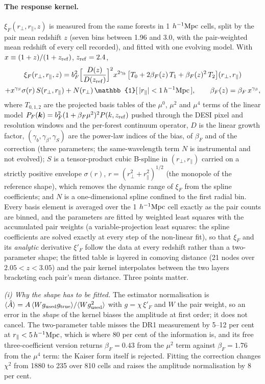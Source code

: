 \documentclass[11pt,a4paper]{article}
\newcommand{\Mpch}{\,h^{-1}{\rm Mpc}}
\begin{document}
\paragraph{The response kernel.} $\xi_F(r_\perp,r_\parallel,z)$ is measured from the same forests in 1\,$\Mpch$ cells, split by the pair mean redshift $z$ (seven bins between 1.96 and 3.0, with the pair-weighted mean redshift of every cell recorded), and fitted with one evolving model. With $x\equiv(1+z)/(1+z_{\rm ref})$, $z_{\rm ref}=2.4$,
\begin{multline}
\xi_F(r_\perp,r_\parallel,z)=b_F^2\Big[\frac{D(z)}{D(z_{\rm ref})}\Big]^2x^{2\gamma_b}\,\big[T_0+2\beta_F(z)\,T_1+\beta_F(z)^2\,T_2\big](r_\perp,r_\parallel)\\
+x^{\gamma_S}\sigma(r)\,S(r_\perp,r_\parallel)+N(r_\perp)\,\mathbb{1}[\,|r_\parallel|<1\Mpch\,],\qquad\beta_F(z)=\beta_F\,x^{\gamma_\beta},
\label{eq:xifit}
\end{multline}
where $T_{0,1,2}$ are the projected basis tables of the $\mu^0$, $\mu^2$ and $\mu^4$ terms of the linear model $P_F(\bm k)=b_F^2(1+\beta_F\mu^2)^2P(k,z_{\rm ref})$ pushed through the DESI pixel and resolution windows and the per-forest continuum operator, $D$ is the linear growth factor, $(\gamma_b,\gamma_\beta,\gamma_S)$ are the power-law indices of the bias, of $\beta_F$ and of the correction (three parameters; the same-wavelength term $N$ is instrumental and not evolved); $S$ is a tensor-product cubic B-spline in $(r_\perp,r_\parallel)$ carried on a strictly positive envelope $\sigma(r)$, $r=(r_\perp^2+r_\parallel^2)^{1/2}$ (the monopole of the reference shape), which removes the dynamic range of $\xi_F$ from the spline coefficients; and $N$ is a one-dimensional spline confined to the first radial bin. Every basis element is averaged over the 1\,$\Mpch$ cell exactly as the pair counts are binned, and the parameters are fitted by weighted least squares with the accumulated pair weights (a variable-projection least squares: the spline coefficients are solved exactly at every step of the non-linear fit), so that $\xi_F$ and its \emph{analytic} derivative $\xi'_F$ follow the data at every redshift rather than a two-parameter shape; the fitted table is layered in comoving distance (21 nodes over $2.05<z<3.05$) and the pair kernel interpolates between the two layers bracketing each pair's mean distance. Three points matter.

\emph{(i) Why the shape has to be fitted.} The estimator normalisation is $\langle\hat A\rangle=A\,\langle Wg_{\rm used}g_{\rm true}\rangle/\langle Wg_{\rm used}^2\rangle$ with $g=\chi\,\xi'_F$ and $W$ the pair weight, so an error in the \emph{shape} of the kernel biases the amplitude at first order; it does not cancel. The two-parameter table misses the DR1 measurement by 5--12 per cent at $r_\parallel<5\Mpch$, which is where 80 per cent of the information is, and its free three-coefficient version returns $\beta_F=0.43$ from the $\mu^2$ term against $\beta_F=1.76$ from the $\mu^4$ term: the Kaiser form itself is rejected. Fitting the correction changes $\chi^2$ from 1880 to 235 over 810 cells and raises the amplitude normalisation by 8 per cent.
\end{document}
